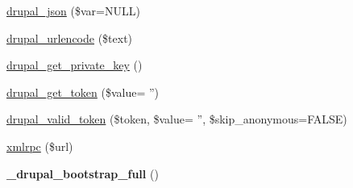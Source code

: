 \begin{CompactItemize}
\hyperlink{common_8inc_7a19d30a73daf3e34ed67000c435afc5}{drupal\_\-json} (\$var=NULL)
\item 
\hyperlink{common_8inc_8478a3dfd0413b75418465e063d7f601}{drupal\_\-urlencode} (\$text)
\item 
\hyperlink{common_8inc_73373e2d357d0e624c209efe27515af6}{drupal\_\-get\_\-private\_\-key} ()
\item 
\hyperlink{common_8inc_16989177d9fa05df9b45e8797ce04994}{drupal\_\-get\_\-token} (\$value= '')
\item 
\hyperlink{common_8inc_343a6ad44cfc1007b618b245f9366be8}{drupal\_\-valid\_\-token} (\$token, \$value= '', \$skip\_\-anonymous=FALSE)
\item 
\hyperlink{common_8inc_2bbed4b1646f9ddc309a752e451a86b2}{xmlrpc} (\$url)
\item 
\hypertarget{common_8inc_b7818b78cd7ba93b8b7522324bddb72d}{
\textbf{\_\-drupal\_\-bootstrap\_\-full} ()}
\label{common_8inc_b7818b78cd7ba93b8b7522324bddb72d}


\end{CompactItemize}

